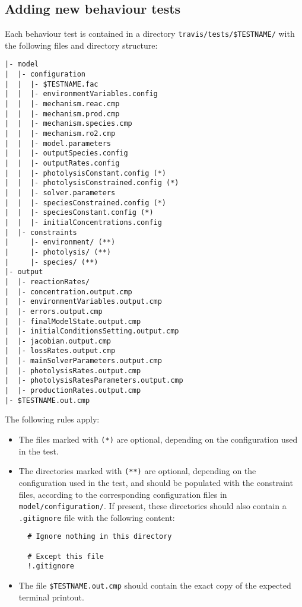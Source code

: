 \subsection{Adding new behaviour tests} \label{subsec:adding-new-behaviour-tests}

Each behaviour test is contained in a directory
\texttt{travis/tests/\$TESTNAME/} with the following files and
directory structure:

\begin{verbatim}
|- model
|  |- configuration
|  |  |- $TESTNAME.fac
|  |  |- environmentVariables.config
|  |  |- mechanism.reac.cmp
|  |  |- mechanism.prod.cmp
|  |  |- mechanism.species.cmp
|  |  |- mechanism.ro2.cmp
|  |  |- model.parameters
|  |  |- outputSpecies.config
|  |  |- outputRates.config
|  |  |- photolysisConstant.config (*)
|  |  |- photolysisConstrained.config (*)
|  |  |- solver.parameters
|  |  |- speciesConstrained.config (*)
|  |  |- speciesConstant.config (*)
|  |  |- initialConcentrations.config
|  |- constraints
|     |- environment/ (**)
|     |- photolysis/ (**)
|     |- species/ (**)
|- output
|  |- reactionRates/
|  |- concentration.output.cmp
|  |- environmentVariables.output.cmp
|  |- errors.output.cmp
|  |- finalModelState.output.cmp
|  |- initialConditionsSetting.output.cmp
|  |- jacobian.output.cmp
|  |- lossRates.output.cmp
|  |- mainSolverParameters.output.cmp
|  |- photolysisRates.output.cmp
|  |- photolysisRatesParameters.output.cmp
|  |- productionRates.output.cmp
|- $TESTNAME.out.cmp
\end{verbatim}

The following rules apply:

\begin{itemize}
\item The files marked with \texttt{(*)} are optional, depending on
  the configuration used in the test.
\item The directories marked with \texttt{(**)} are optional,
  depending on the configuration used in the test, and should be
  populated with the constraint files, according to the corresponding
  configuration files in \texttt{model/configuration/}. If present,
  these directories should also contain a \texttt{.gitignore} file
  with the following content:
  \begin{verbatim}
  # Ignore nothing in this directory

  # Except this file
  !.gitignore
  \end{verbatim}
\item The file \texttt{\$TESTNAME.out.cmp} should contain the exact
  copy of the expected terminal printout.
\end{itemize}

